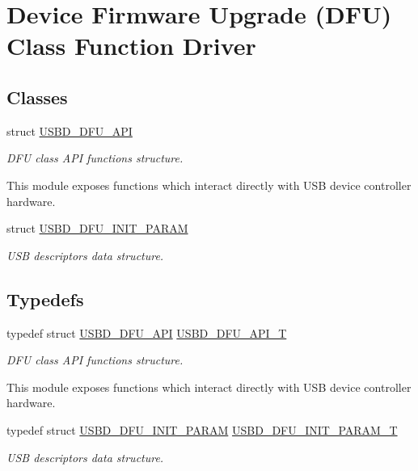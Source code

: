\hypertarget{group__USBD__DFU}{}\section{Device Firmware Upgrade (D\+FU) Class Function Driver}
\label{group__USBD__DFU}
\subsection*{Classes}
\begin{DoxyCompactItemize}
\item 
struct \hyperlink{structUSBD__DFU__API}{U\+S\+B\+D\+\_\+\+D\+F\+U\+\_\+\+A\+PI}
\begin{DoxyCompactList}\small\item\em D\+FU class A\+PI functions structure.

This module exposes functions which interact directly with U\+SB device controller hardware. \end{DoxyCompactList}\item 
struct \hyperlink{structUSBD__DFU__INIT__PARAM}{U\+S\+B\+D\+\_\+\+D\+F\+U\+\_\+\+I\+N\+I\+T\+\_\+\+P\+A\+R\+AM}
\begin{DoxyCompactList}\small\item\em U\+SB descriptors data structure. \end{DoxyCompactList}\end{DoxyCompactItemize}
\subsection*{Typedefs}
\begin{DoxyCompactItemize}
\item 
typedef struct \hyperlink{structUSBD__DFU__API}{U\+S\+B\+D\+\_\+\+D\+F\+U\+\_\+\+A\+PI} \hyperlink{group__USBD__DFU_gadf9281f8af1223053e3ccf48e26ac80d}{U\+S\+B\+D\+\_\+\+D\+F\+U\+\_\+\+A\+P\+I\+\_\+T}
\begin{DoxyCompactList}\small\item\em D\+FU class A\+PI functions structure.

This module exposes functions which interact directly with U\+SB device controller hardware. \end{DoxyCompactList}\item 
typedef struct \hyperlink{structUSBD__DFU__INIT__PARAM}{U\+S\+B\+D\+\_\+\+D\+F\+U\+\_\+\+I\+N\+I\+T\+\_\+\+P\+A\+R\+AM} \hyperlink{group__USBD__DFU_ga8506b43ae2bda83cc8c459114fd3fc82}{U\+S\+B\+D\+\_\+\+D\+F\+U\+\_\+\+I\+N\+I\+T\+\_\+\+P\+A\+R\+A\+M\+\_\+T}
\begin{DoxyCompactList}\small\item\em U\+SB descriptors data structure. \end{DoxyCompactList}\end{DoxyCompactItemize}


